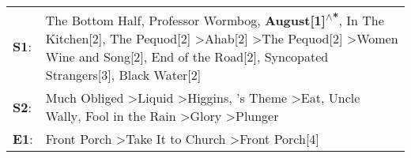 \begin{supertabular}{p{0.03\textwidth}p{0.92\textwidth}}
 \textbf{S1}:  &  The Bottom Half\textsuperscript{}, \enspace Professor Wormbog\textsuperscript{}, \enspace \textbf{August[1]\textsuperscript{$\wedge$*}}, \enspace In The Kitchen[2]\textsuperscript{}, \enspace The Pequod[2]\textsuperscript{} \textgreater \enspace Ahab[2]\textsuperscript{} \textgreater \enspace The Pequod[2]\textsuperscript{} \textgreater \enspace Women Wine and Song[2]\textsuperscript{}, \enspace End of the Road[2]\textsuperscript{}, \enspace Syncopated Strangers[3]\textsuperscript{}, \enspace Black Water[2]\textsuperscript{}  \enspace  \\
 \textbf{S2}:  &                                                                                                                                                 Much Obliged\textsuperscript{} \textgreater \enspace Liquid\textsuperscript{} \textgreater \enspace Higgins\textsuperscript{}, 's Theme\textsuperscript{} \textgreater \enspace Eat\textsuperscript{}, \enspace Uncle Wally\textsuperscript{}, \enspace Fool in the Rain\textsuperscript{} \textgreater \enspace Glory\textsuperscript{} \textgreater \enspace Plunger\textsuperscript{}  \enspace  \\
 \textbf{E1}:  &                                                                                                                                                                                                                                                                                                                                                                                                      Front Porch\textsuperscript{} \textgreater \enspace Take It to Church\textsuperscript{} \textgreater \enspace Front Porch[4]\textsuperscript{}  \enspace  \\
\end{supertabular}
